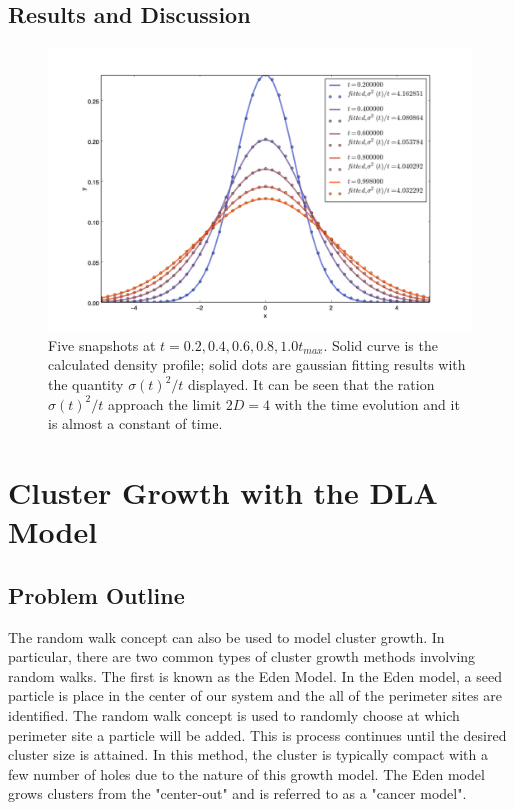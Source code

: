 \documentclass[a4paper,12pt]{article}
\begin{document}
\subsection{Results and Discussion}
\begin{figure}[htbp]
\begin{center}
\includegraphics[width = \textwidth]{pics/diffusion_snapshot.jpeg}
\caption{Five snapshots at $t = 0.2, 0.4, 0.6, 0.8, 1.0 t_{max}$. Solid curve is the calculated density profile; solid dots are gaussian fitting results with the quantity $\sigma(t)^2/t$ displayed. It can be seen that the ration $\sigma(t)^2/t$ approach the limit $2D = 4$ with the time evolution and it is almost a constant of time.}
\label{default}
\end{center}
\end{figure}



\section{Cluster Growth with the DLA Model}
\subsection{Problem Outline}
\indent
\indent The random walk concept can also be used to model cluster growth.  In particular, there are two common types of cluster growth methods involving random walks.
The first is known as the Eden Model.  In the Eden model, a seed particle is place in the center of our system and the all of the perimeter sites are identified.  The 
random walk concept is used to randomly choose at which perimeter site a particle will be added.  This is process continues until the desired cluster size is attained.
In this method, the cluster is typically compact with a few number of holes due to the nature of this growth model.  The Eden model grows clusters from the "center-out" 
and is referred to as a "cancer model". 
\end{document}
